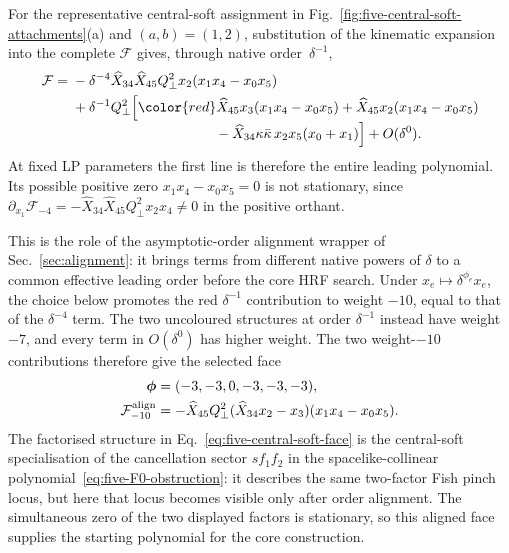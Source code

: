 \documentclass[a4paper,11pt]{article}
\newcommand{\SLcolour}[1]{{\color{red}#1}}
\begin{document}
For the representative central-soft assignment in
Fig.~\ref{fig:five-central-soft-attachments}(a) and \((a,b)=(1,2)\),
substitution of the kinematic expansion into the complete \(\mathcal F\)
gives, through native order~\(\delta^{-1}\),
\begin{align*}
 \mathcal F={}&
 -\delta^{-4}\widehat X_{34}\widehat X_{45}Q_\perp^2x_2
   (x_1x_4-x_0x_5)\\
 &+\delta^{-1}Q_\perp^2\Bigl[
   \SLcolour{\widehat X_{45}x_3(x_1x_4-x_0x_5)}
   +\widehat X_{45}x_2(x_1x_4-x_0x_5)\\[-1mm]
 &\hspace{36mm}
   -\widehat X_{34}\kappa\bar\kappa\,x_2x_5(x_0+x_1)
   \Bigr]
 +O(\delta^0).
\end{align*}
At fixed LP parameters the first line is therefore the entire leading
polynomial.  Its possible positive zero
\(x_1x_4-x_0x_5=0\) is not stationary, since
\(
 \partial_{x_1}\mathcal F_{-4}
 =-\widehat X_{34}\widehat X_{45}Q_\perp^2x_2x_4\ne0
\)
in the positive orthant.

This is the role of the asymptotic-order alignment wrapper of
Sec.~\ref{sec:alignment}: it brings terms from different native powers of
\(\delta\) to a common effective leading order before the core HRF search.
Under \(x_e\mapsto\delta^{\phi_e}x_e\), the choice below promotes the red
\(\delta^{-1}\) contribution to weight \(-10\), equal to that of the
\(\delta^{-4}\) term.  The two uncoloured structures at order
\(\delta^{-1}\) instead have weight \(-7\), and every term in
\(O(\delta^0)\) has higher weight.  The two weight-\(-10\) contributions
therefore give the selected face
\begin{align}
 \boldsymbol\phi&=(-3,-3,0,-3,-3,-3),\nonumber\\
 \mathcal F_{-10}^{\rm align}
 &=-\widehat X_{45}Q_\perp^2
 (\widehat X_{34}x_2-x_3)(x_1x_4-x_0x_5).
 \label{eq:five-central-soft-face}
\end{align}
The factorised structure in Eq.~\eqref{eq:five-central-soft-face} is the
central-soft specialisation of the cancellation sector \(s f_1f_2\) in the
spacelike-collinear polynomial~\eqref{eq:five-F0-obstruction}: it describes
the same two-factor Fish pinch locus, but here that locus becomes visible
only after order alignment.  The simultaneous zero of the two displayed
factors is stationary, so this aligned face supplies the starting polynomial
for the core construction.
\end{document}
